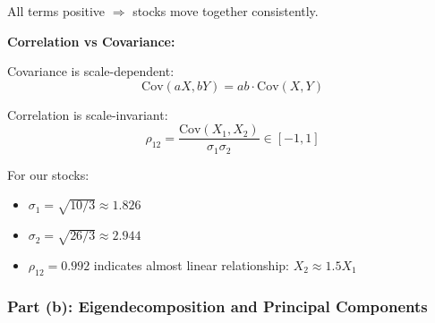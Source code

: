\documentclass[12pt]{article}
\begin{document}
\begin{explanation}
All terms positive $\Rightarrow$ stocks move together consistently.

\textbf{Correlation vs Covariance:}

Covariance is scale-dependent:
\[
\text{Cov}(aX, bY) = ab \cdot \text{Cov}(X, Y)
\]

Correlation is scale-invariant:
\[
\rho_{12} = \frac{\text{Cov}(X_1, X_2)}{\sigma_1 \sigma_2} \in [-1, 1]
\]

For our stocks:
\begin{itemize}
    \item $\sigma_1 = \sqrt{10/3} \approx 1.826$
    \item $\sigma_2 = \sqrt{26/3} \approx 2.944$
    \item $\rho_{12} = 0.992$ indicates almost linear relationship: $X_2 \approx 1.5 X_1$
\end{itemize}

\end{explanation}

\subsubsection{Part (b): Eigendecomposition and Principal Components}
\end{document}
